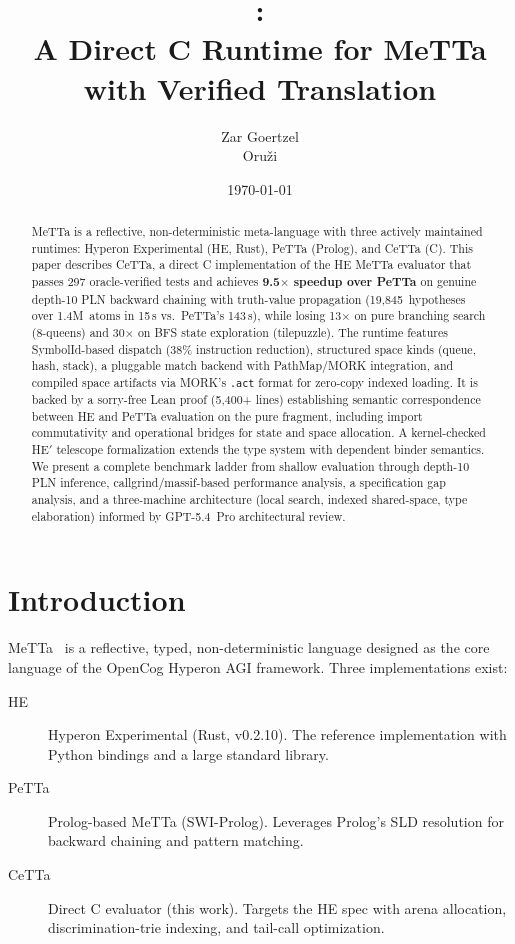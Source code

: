 \documentclass[11pt]{article}
\title{\CeTTa{}:\\
\large A Direct C Runtime for MeTTa with Verified Translation}
\author{Zar Goertzel\\Oru\v{z}i}
\date{\today}
\newcommand{\code}[1]{\texttt{#1}}
\newcommand{\PeTTa}{\textup{PeTTa}}
\newcommand{\HE}{\textup{HE}}
\newcommand{\CeTTa}{\textup{CeTTa}}
\begin{document}
\maketitle

\begin{abstract}
MeTTa is a reflective, non-deterministic meta-language with three
actively maintained runtimes: Hyperon Experimental (\HE{}, Rust),
\PeTTa{} (Prolog), and \CeTTa{} (C).  This paper describes \CeTTa{},
a direct C implementation of the \HE{} MeTTa evaluator that passes 297
oracle-verified tests and achieves \textbf{9.5$\times$ speedup over
\PeTTa{}} on genuine depth-10 PLN backward chaining with truth-value
propagation (19{,}845~hypotheses over 1.4M~atoms in 15\,s vs.\
\PeTTa{}'s 143\,s), while losing 13$\times$ on pure branching search
(8-queens) and 30$\times$ on BFS state exploration (tilepuzzle).
The runtime features SymbolId-based dispatch (38\% instruction
reduction), structured space kinds (queue, hash, stack), a pluggable
match backend with PathMap/MORK integration, and compiled space
artifacts via MORK's \code{.act} format for zero-copy indexed loading.
It is backed by a sorry-free Lean proof (5{,}400+ lines) establishing
semantic correspondence between \HE{} and \PeTTa{} evaluation on the
pure fragment, including import commutativity and operational bridges
for state and space allocation.  A kernel-checked HE$'$ telescope
formalization extends the type system with dependent binder semantics.
We present a complete benchmark ladder from shallow evaluation through
depth-10 PLN inference, callgrind/massif-based performance analysis,
a specification gap analysis, and a three-machine architecture (local
search, indexed shared-space, type elaboration) informed by GPT-5.4~Pro
architectural review.
\end{abstract}

\section{Introduction}

MeTTa~\cite{metta} is a reflective, typed, non-deterministic language
designed as the core language of the OpenCog Hyperon AGI framework.
Three implementations exist:

\begin{description}
\item[\HE{}] Hyperon Experimental (Rust, v0.2.10).  The reference
  implementation with Python bindings and a large standard library.
\item[\PeTTa{}] Prolog-based MeTTa (SWI-Prolog).  Leverages Prolog's
  SLD resolution for backward chaining and pattern matching.
\item[\CeTTa{}] Direct C evaluator (this work).  Targets the \HE{} spec
  with arena allocation, discrimination-trie indexing, and tail-call
  optimization.
\end{description}
\end{document}
